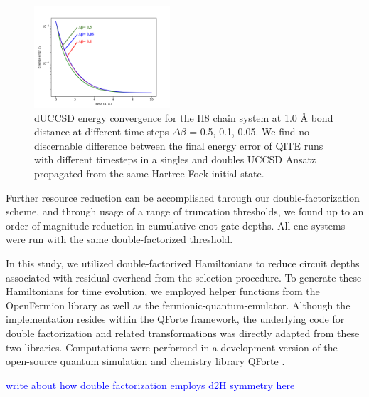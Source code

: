 \documentclass[aip,jcp,amsmath,amssymb, reprint]{revtex4-1}
\newcommand{\note}[2]{%
  \ifthenelse{\boolean{shownotes}}%
    {\textcolor{#1}{#2}}%
    {}%
}
\begin{document}
\begin{figure}[h!]
\centering
\includegraphics[width=0.45\textwidth]{sqite_paper/paper_db_plot.png}
\caption{dUCCSD energy convergence for the H8 chain system at 1.0 Å bond distance at different time steps $\Delta\beta$ = 0.5, 0.1, 0.05. We find no discernable difference between the final energy error of QITE runs with different timesteps in a singles and doubles UCCSD Ansatz propagated from the same Hartree-Fock initial state.}
\label{fig:db_plot_1.0A}
\end{figure}

Further resource reduction can be accomplished through our double-factorization scheme, and through usage of a range of truncation thresholds, we found up to an order of magnitude reduction in cumulative cnot gate depths. All ene systems were run with the same double-factorized threshold.

In this study, we utilized double-factorized Hamiltonians to reduce circuit depths associated with residual overhead from the selection procedure. To generate these Hamiltonians for time evolution, we employed helper functions from the OpenFermion\cite{mcclean2020openfermion} library as well as the fermionic-quantum-emulator.\cite{rubin2021fermionic} Although the implementation resides within the QForte framework, the underlying code for double factorization and related transformations was directly adapted from these two libraries. Computations were performed in a development version of the open-source quantum simulation and chemistry library QForte \cite{stair2021qforte}. 


\note{blue}{write about how double factorization employs d2H symmetry here}


\end{document}
